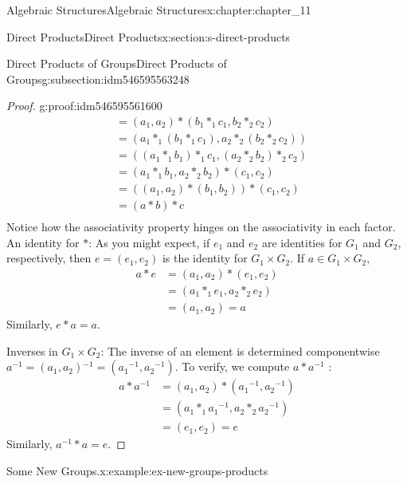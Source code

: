\documentclass[oneside,10pt,]{book}
\numberwithin{equation}{section}
\begin{document}
\begin{chapterptx}{Algebraic Structures}{}{Algebraic Structures}{}{}{x:chapter:chapter_11}
\begin{sectionptx}{Direct Products}{}{Direct Products}{}{}{x:section:s-direct-products}
\begin{subsectionptx}{Direct Products of Groups}{}{Direct Products of Groups}{}{}{g:subsection:idm546595563248}
\begin{proof}{}{g:proof:idm546595561600}
\begin{equation*}
\begin{split}
&  =\left(a_1,a_2\right)*\left(b_1*_1c_1,b_2*_2c_2\right)\\
&  = \left(a_1*_1\left(b_1*_1c_1\right),a_2*_2\left(b_2*_2c_2\right)\right)\\
&  = \left(\left(a_1*_1b_1\right)*_1c_1,\left(a_2*_2b_2\right)*_2c_2\right)\\
&  = \left(a_1*_1b_1,a_2*_2b_2\right)*\left(c_1,c_2\right)\\
&  = \left(\left(a_1,a_2\right)*\left(b_1,b_2\right)\right)*\left(c_1,c_2\right)\\
&  = (a * b)*c\\
\end{split}
\end{equation*}
Notice how the associativity property hinges on the associativity in each factor. An identity for \(*\): As you might expect, if \(e_1\) and \(e_2\) are identities for \(G_1\) and \(G_2\), respectively, then  \(e = \left(e_1, e
_2 \right)\) is the identity for \(G_1 \times G_2\).  If  \(a \in G_1\times G_2\),%
\begin{equation*}
\begin{split}
a * e &=\left(a_1,a_2\right)* \left(e_1, e _2 \right)\\
& = \left(a_1*_1e_1,a_2*_2 e _2\right)\\
& = \left(a_1,a_2\right) = a
\end{split}
\end{equation*}
Similarly, \(e * a = a\).%
\par
Inverses in \(G_1\times G_2\): The inverse of an element is determined componentwise \(a^{-1}= \left(a_1,a_2\right){}^{-1}=\left(a_1{}^{-1},a_2{}^{-1}\right)\). To verify, we compute \(a * a^{-1}\) :%
\begin{equation*}
\begin{split}
a * a^{-1} &=\left(a_1,a_2\right)*\left(a_1{}^{-1},a_2{}^{-1}\right)\\
& =\left(a_1*_1a_1{}^{-1},a_2*_2a_2{}^{-1}\right)\\
& = \left(e_1, e _2 \right) =e
\end{split}
\end{equation*}
Similarly, \(a^{-1} * a=e\).%
\end{proof}
\begin{example}{Some New Groups.}{x:example:ex-new-groups-products}%
%
\begin{enumerate}[label=(\alph*)]

\end{enumerate}
\end{example}
\end{subsectionptx}
\end{sectionptx}
\end{chapterptx}
\end{document}

